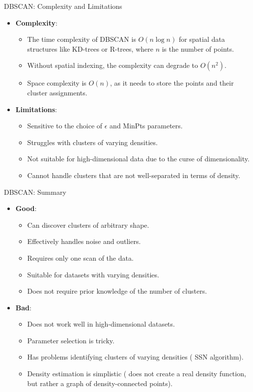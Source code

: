 \begin{frame}[allowframebreaks]{DBSCAN: Complexity and Limitations}
\begin{itemize}
    \item \textbf{Complexity}:
    \begin{itemize}
        \item The time complexity of DBSCAN is $O(n \log n)$ for spatial data structures like KD-trees or R-trees, where $n$ is the number of points.
        \item Without spatial indexing, the complexity can degrade to $O(n^2)$.
        \item Space complexity is $O(n)$, as it needs to store the points and their cluster assignments.
    \end{itemize}
    \item \textbf{Limitations}:
    \begin{itemize}
        \item Sensitive to the choice of $\epsilon$ and MinPts parameters.
        \item Struggles with clusters of varying densities.
        \item Not suitable for high-dimensional data due to the curse of dimensionality.
        \item Cannot handle clusters that are not well-separated in terms of density.
    \end{itemize}
\end{itemize}
\end{frame}


\begin{frame}[allowframebreaks]{DBSCAN: Summary}
\begin{itemize}
    \item \textbf{Good}:
    \begin{itemize}
        \item Can discover clusters of arbitrary shape.
        \item Effectively handles noise and outliers.
        \item Requires only one scan of the data.
        \item Suitable for datasets with varying densities.
        \item Does not require prior knowledge of the number of clusters.
    \end{itemize}
    \item \textbf{Bad}:
    \begin{itemize}
        \item Does not work well in high-dimensional datasets.
        \item Parameter selection is tricky.
        \item Has problems identifying clusters of varying densities (\textrightarrow{} SSN algorithm).
        \item Density estimation is simplistic (\textrightarrow{} does not create a real density function, but rather a graph of density-connected points).
    \end{itemize}
\end{itemize}
\end{frame}


